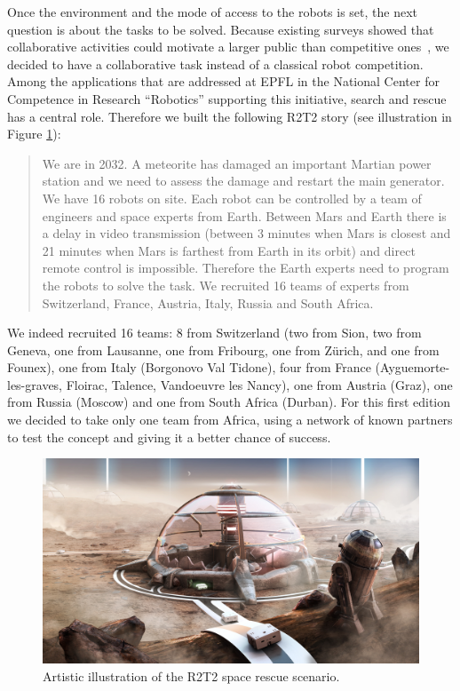 \documentclass{intech-journal}
\begin{document}
Once the environment and the mode of access to the robots is set, the next question is about the tasks to be solved.
Because existing surveys showed that collaborative activities could motivate a larger public than competitive ones~\cite{riedo2013upgrade}, we decided to have a collaborative task instead of a classical robot competition. 
Among the applications that are addressed at EPFL in the National Center for Competence in Research ``Robotics'' supporting this initiative, search and rescue has a central role.
Therefore we built the following R2T2 story (see illustration in Figure \ref{fig:illustration}):
\begin{quotation}
We are in 2032. A meteorite has damaged an important Martian power station and we need to assess the damage and restart the main generator. We have 16 robots on site. Each robot can be controlled by a team of engineers and space experts from Earth. Between Mars and Earth there is a delay in video transmission (between 3 minutes when Mars is closest and 21 minutes when Mars is farthest from Earth in its orbit) and direct remote control is impossible. Therefore the Earth experts need to program the robots to solve the task. We recruited 16 teams of experts from Switzerland, France, Austria, Italy, Russia and South Africa.
\end{quotation}
We indeed recruited 16 teams: 8 from Switzerland (two from Sion, two from Geneva, one from Lausanne, one from Fribourg, one from Z\"urich, and one from Founex), one from Italy (Borgonovo Val Tidone), four from France (Ayguemorte-les-graves, Floirac, Talence, Vandoeuvre les Nancy), one from Austria (Graz), one from Russia (Moscow) and one from South Africa (Durban). 
For this first edition we decided to take only one team from Africa, using a network of known partners to test the concept  and giving it a better chance of success.

\begin{figure}[ht]
 \centering
    \includegraphics[width=0.7\columnwidth]{figures/r2t2_illu.jpg}
  \caption{Artistic illustration of the R2T2 space rescue scenario.}
  \label{fig:illustration} 
\end{figure}
\end{document}
